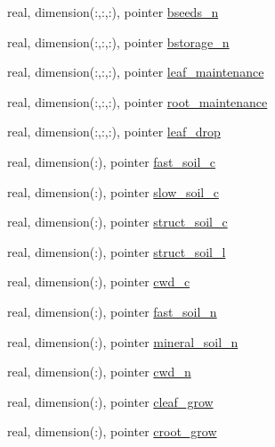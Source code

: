 \begin{DoxyCompactItemize}
\item 
real, dimension(\+:,\+:,\+:), pointer \hyperlink{structed__state__vars_1_1edtype_abbb79aeecf03d2e2fed3b1a9f20a9bbb}{bseeds\+\_\+n}
\item 
real, dimension(\+:,\+:,\+:), pointer \hyperlink{structed__state__vars_1_1edtype_a65e18b5d3a07604ad52862a37b370e14}{bstorage\+\_\+n}
\item 
real, dimension(\+:,\+:,\+:), pointer \hyperlink{structed__state__vars_1_1edtype_ae42095808a84c030d22003ba9efbe7df}{leaf\+\_\+maintenance}
\item 
real, dimension(\+:,\+:,\+:), pointer \hyperlink{structed__state__vars_1_1edtype_a420acbb1ba49d3a3a479a3728c36ab38}{root\+\_\+maintenance}
\item 
real, dimension(\+:,\+:,\+:), pointer \hyperlink{structed__state__vars_1_1edtype_a1b00086f40d99abdf2bc10ce272b135e}{leaf\+\_\+drop}
\item 
real, dimension(\+:), pointer \hyperlink{structed__state__vars_1_1edtype_a8bc0cfe7bb4e0cc3371ddad9634d931b}{fast\+\_\+soil\+\_\+c}
\item 
real, dimension(\+:), pointer \hyperlink{structed__state__vars_1_1edtype_acf9ec270975e8944b0d107553e8b2a83}{slow\+\_\+soil\+\_\+c}
\item 
real, dimension(\+:), pointer \hyperlink{structed__state__vars_1_1edtype_ab7abb8aecd49f78157608e1481a32345}{struct\+\_\+soil\+\_\+c}
\item 
real, dimension(\+:), pointer \hyperlink{structed__state__vars_1_1edtype_a5398d06d5e12d9f3f410792be76c9f69}{struct\+\_\+soil\+\_\+l}
\item 
real, dimension(\+:), pointer \hyperlink{structed__state__vars_1_1edtype_ad8323a46f76373e8fec13f376b6643e9}{cwd\+\_\+c}
\item 
real, dimension(\+:), pointer \hyperlink{structed__state__vars_1_1edtype_a34afeab41f7c416ba4ff341e812807f4}{fast\+\_\+soil\+\_\+n}
\item 
real, dimension(\+:), pointer \hyperlink{structed__state__vars_1_1edtype_a040c73c2f3e2719cf484445a80c708c6}{mineral\+\_\+soil\+\_\+n}
\item 
real, dimension(\+:), pointer \hyperlink{structed__state__vars_1_1edtype_acb3b592b6f9c5b115802cc8a04b19a40}{cwd\+\_\+n}
\item 
real, dimension(\+:), pointer \hyperlink{structed__state__vars_1_1edtype_afd70ab5cc0691cd58b13e5d06a800a5b}{cleaf\+\_\+grow}
\item 
real, dimension(\+:), pointer \hyperlink{structed__state__vars_1_1edtype_afb7daca4b3647dcd52f9bbedabd1b569}{croot\+\_\+grow}

\end{DoxyCompactItemize}
